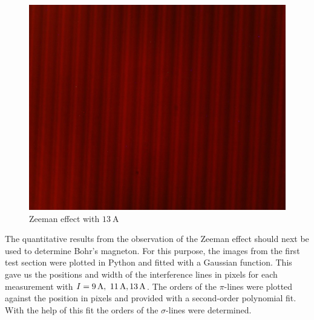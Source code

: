 \begin{figure}[ht]
\centering
\includegraphics[scale=.15]{images//interference.jpg}
\caption{Zeeman effect with $\SI{13}{\ampere}$}
\label{fig:interference}
\end{figure}
The quantitative results from the observation of the Zeeman effect should next be used to determine Bohr's magneton.
For this purpose, the images from the first test section were plotted in Python and fitted with a Gaussian function.
This gave us the positions and width of the interference lines in pixels for each measurement with $I =\SIlist{9;11;13}{\ampere}$.
The orders of the $\pi$-lines were plotted against the position in pixels and provided with a second-order polynomial fit.
With the help of this fit the orders of the $\sigma$-lines were determined.\\

